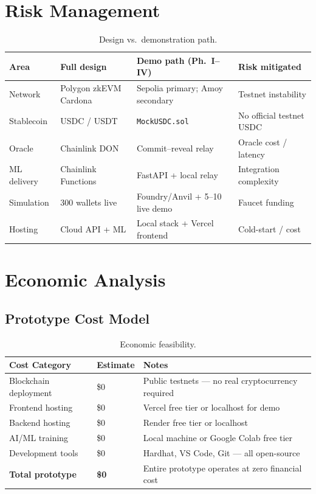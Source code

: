 \section{Risk Management}
\label{sec:risk-management}
\label{sec:design-limitations}

\begin{table}[H]
\centering
\small
\caption[Design vs.\ demonstration path]{Design vs.\ demonstration path.}
\label{tab:design-vs-demo}
\label{tab:zero-cost-risks}
\begin{tabular}{@{}p{2.8cm}p{4.2cm}p{4.2cm}p{3.2cm}@{}}
\toprule
\tableheadcolor
\textbf{Area} & \textbf{Full design} & \textbf{Demo path (Ph.~I--IV)} & \textbf{Risk mitigated} \\
\midrule
Network & Polygon zkEVM Cardona & Sepolia primary; Amoy secondary & Testnet instability \\
Stablecoin & USDC / USDT & \texttt{MockUSDC.sol} & No official testnet USDC \\
Oracle & Chainlink DON & Commit--reveal relay & Oracle cost / latency \\
ML delivery & Chainlink Functions & FastAPI + local relay & Integration complexity \\
Simulation & 300 wallets live & Foundry/Anvil + 5--10 live demo & Faucet funding \\
Hosting & Cloud API + ML & Local stack + Vercel frontend & Cold-start / cost \\
\bottomrule
\end{tabular}
\end{table}

\section{Economic Analysis}
\label{sec:economic-analysis}

\subsection{Prototype Cost Model}
\label{sec:economic-feasibility}

\begin{table}[H]
\centering
\caption[Economic feasibility]{Economic feasibility.}
\label{tab:economic-feasibility}
\begin{tabular}{p{4cm}p{2.5cm}p{7cm}}
\toprule
\tableheadcolor
\textbf{Cost Category} & \textbf{Estimate} & \textbf{Notes} \\
\midrule
Blockchain deployment & \$0 & Public testnets --- no real cryptocurrency required \\
Frontend hosting & \$0 & Vercel free tier or localhost for demo \\
Backend hosting & \$0 & Render free tier or localhost \\
AI/ML training & \$0 & Local machine or Google Colab free tier \\
Development tools & \$0 & Hardhat, VS Code, Git --- all open-source \\
\textbf{Total prototype} & \textbf{\$0} & Entire prototype operates at zero financial cost \\
\bottomrule
\end{tabular}
\end{table}

